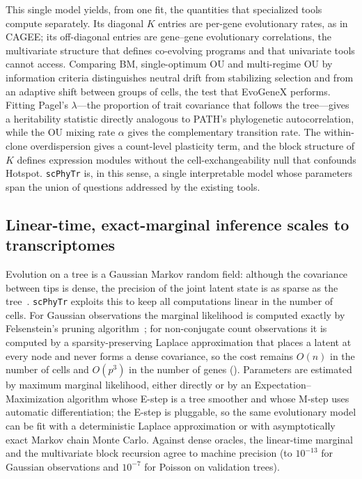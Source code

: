 \documentclass{article}
\newcommand{\scphytr}{\texttt{scPhyTr}}
\begin{document}
This single model yields, from one fit, the quantities that specialized tools compute
separately. Its diagonal $K$ entries are per-gene evolutionary rates, as in CAGEE; its
off-diagonal entries are gene--gene evolutionary correlations, the multivariate structure
that defines co-evolving programs and that univariate tools cannot access. Comparing BM,
single-optimum OU and multi-regime OU by information criteria distinguishes neutral drift
from stabilizing selection and from an adaptive shift between groups of cells, the test
that EvoGeneX performs. Fitting Pagel's $\lambda$---the proportion of trait covariance
that follows the tree---gives a heritability statistic directly analogous to PATH's
phylogenetic autocorrelation, while the OU mixing rate $\alpha$ gives the complementary
transition rate. The within-clone overdispersion gives a count-level plasticity term,
and the block structure of $K$ defines expression modules without the cell-exchangeability
null that confounds Hotspot. \scphytr{} is, in this sense, a single interpretable model
whose parameters span the union of questions addressed by the existing tools.

\subsection*{Linear-time, exact-marginal inference scales to transcriptomes}

Evolution on a tree is a Gaussian Markov random field: although the covariance between
tips is dense, the precision of the joint latent state is as sparse as the
tree~\cite{rue_held_2005}. \scphytr{} exploits this to keep all computations linear in the
number of cells. For Gaussian observations the marginal likelihood is computed exactly by
Felsenstein's pruning algorithm~\cite{felsenstein_pruning_1973}; for non-conjugate count
observations it is computed by a sparsity-preserving Laplace approximation that places a
latent at every node and never forms a dense covariance, so the cost remains $O(n)$ in the
number of cells and $O(p^3)$ in the number of genes (). Parameters are
estimated by maximum marginal likelihood, either directly or by an
Expectation--Maximization algorithm whose E-step is a tree smoother and whose M-step uses
automatic differentiation; the E-step is pluggable, so the same evolutionary model can be
fit with a deterministic Laplace approximation or with asymptotically exact Markov chain
Monte Carlo. Against dense oracles, the linear-time marginal and the multivariate block
recursion agree to machine precision (to $10^{-13}$ for Gaussian observations and
$10^{-7}$ for Poisson on validation trees).
\end{document}
